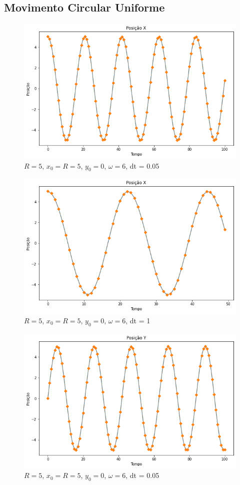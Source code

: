 \documentclass[12pt]{article}
\begin{document}
\subsection{Movimento Circular Uniforme}
\begin{figure}[H]
  \centering
  \includegraphics[scale = 0.6]{imagens/(mcu)posicaoxdt=0.05tf=5.png}
  \caption{$R = 5$, $x_0 = R = 5$, $y_0 = 0$, $\omega = 6$, dt = 0.05}
\end{figure}
\begin{figure}[H]
  \centering
  \includegraphics[scale = 0.6]{imagens/(mcu)posicaoxdt=1tf=50.png}
  \caption{$R = 5$, $x_0 = R = 5$, $y_0 = 0$, $\omega = 6$, dt = 1}
\end{figure}
\begin{figure}[H]
  \centering
  \includegraphics[scale = 0.6]{imagens/(mcu)posicaoydt=0.05tf=5.png}
  \caption{$R = 5$, $x_0 = R = 5$, $y_0 = 0$, $\omega = 6$, dt = 0.05}
\end{figure}
\end{document}
